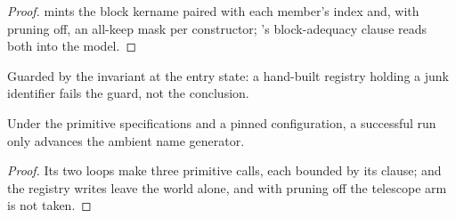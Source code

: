 \begin{proof}
\leanok
{}
  mints the block kername paired with each member's index and, with
pruning off, an all-keep mask per constructor; 's block-adequacy clause reads both into
the model.
\end{proof}
\begin{remark}
 Guarded by the invariant at the entry state: a hand-built registry holding a junk
identifier fails the guard, not the conclusion.
\end{remark}
\begin{lemma}
\label{lem:run_register_inductive_gen}
\leanok
{}
 Under the primitive specifications and a pinned configuration, a successful
 run only advances the ambient name generator.
\end{lemma}
\begin{proof}
\leanok
{}
 Its two loops make three primitive calls, each bounded by its  clause;
 and the registry writes leave the world alone, and with pruning off the telescope arm
is not taken.
\end{proof}
